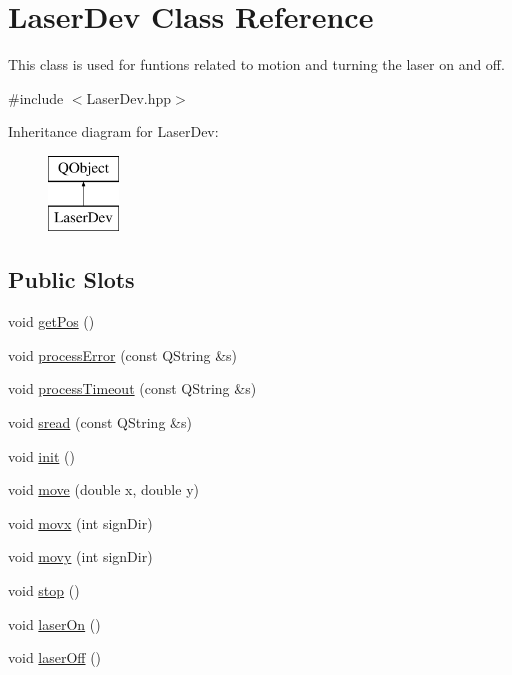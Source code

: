 \hypertarget{class_laser_dev}{\section{Laser\-Dev Class Reference}
\label{class_laser_dev}
}


This class is used for funtions related to motion and turning the laser on and off.  




{\ttfamily \#include $<$Laser\-Dev.\-hpp$>$}

Inheritance diagram for Laser\-Dev\-:\begin{figure}[H]
\begin{center}
\leavevmode
\includegraphics[height=2.000000cm]{class_laser_dev}
\end{center}
\end{figure}
\subsection*{Public Slots}
\begin{DoxyCompactItemize}
\item 
void \hyperlink{class_laser_dev_acafc5e4275cf1fab74218af7af7f34e5}{get\-Pos} ()
\item 
void \hyperlink{class_laser_dev_a337541ffca93b0c2900778a91554ede6}{process\-Error} (const Q\-String \&s)
\item 
void \hyperlink{class_laser_dev_ab016d27d125aa27c856b281e2f9e5370}{process\-Timeout} (const Q\-String \&s)
\item 
void \hyperlink{class_laser_dev_a527679c655073b74703b7399a1adbe8d}{sread} (const Q\-String \&s)
\item 
void \hyperlink{class_laser_dev_aedb2ff8257a72247202b5434780a1655}{init} ()
\item 
void \hyperlink{class_laser_dev_ae66064fa79825cfdc8fb604db0d462af}{move} (double x, double y)
\item 
void \hyperlink{class_laser_dev_a2e229a59571fa9dcd93ebc6a23ecb3c1}{movx} (int sign\-Dir)
\item 
void \hyperlink{class_laser_dev_a6d9a60d963031c9104200014a380b55e}{movy} (int sign\-Dir)
\item 
void \hyperlink{class_laser_dev_a06c0022d17589088dfc7a0dcc56141ed}{stop} ()
\item 
void \hyperlink{class_laser_dev_aee2527432d2b36107c42f3307c8f8c47}{laser\-On} ()
\item 
void \hyperlink{class_laser_dev_a19059c3f944c0c0dae17485676fea678}{laser\-Off} ()
\end{DoxyCompactItemize}
